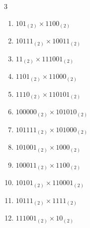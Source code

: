 \begin{multicols}{3}
\begin{enumerate}

  \item $101_{(2)} \times 1100_{(2)}$


  \item $10111_{(2)} \times 10011_{(2)}$


\columnbreak %

\resetques

  \item $11_{(2)} \times 111001_{(2)}$


  \item $1101_{(2)} \times 11000_{(2)}$


  \item $1110_{(2)} \times 110101_{(2)}$


  \item $100000_{(2)} \times 101010_{(2)}$


  \item $101111_{(2)} \times 101000_{(2)}$


\columnbreak %

  \item $101001_{(2)} \times 1000_{(2)}$


  \item $100011_{(2)} \times 1100_{(2)}$


  \item $10101_{(2)} \times 110001_{(2)}$


  \item $10111_{(2)} \times 1111_{(2)}$


  \item $111001_{(2)} \times 10_{(2)}$



\end{enumerate}
\end{multicols}
